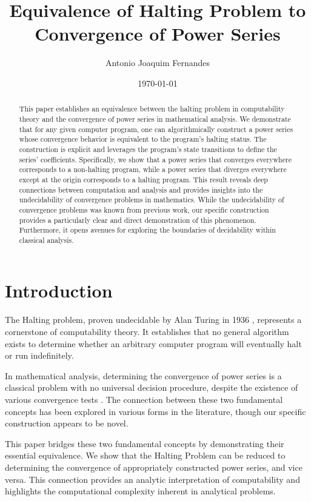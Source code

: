 \documentclass[12pt, a4paper]{article}
\title{Equivalence of Halting Problem to Convergence of Power Series}
\author[1]{Antonio Joaquim Fernandes}
\affil[1]{FCT, Universidade de Cabo Verde}
\date{\today}
\begin{document}
\maketitle

\begin{abstract}
This paper establishes an equivalence between the halting problem in computability theory and the convergence of power series in mathematical analysis. We demonstrate that for any given computer program, one can algorithmically construct a power series whose convergence behavior is equivalent to the program’s halting status. The construction is explicit and leverages the program's state transitions to define the series' coefficients. Specifically, we show that a power series that converges everywhere corresponds to a non-halting program, while a power series that diverges everywhere except at the origin corresponds to a halting program. This result reveals deep connections between computation and analysis and provides insights into the undecidability of convergence problems in mathematics. While the undecidability of convergence problems was known from previous work, our specific construction provides a particularly clear and direct demonstration of this phenomenon. Furthermore, it opens avenues for exploring the boundaries of decidability within classical analysis.
\end{abstract}

\section{Introduction}
The Halting problem, proven undecidable by Alan Turing in 1936 \cite{turing1936computable}, represents a cornerstone of computability theory. It establishes that no general algorithm exists to determine whether an arbitrary computer program will eventually halt or run indefinitely. 

In mathematical analysis, determining the convergence of power series is a classical problem with no universal decision procedure, despite the existence of various convergence tests \cite{rice1953classes,pourel1989computable, weihrauch2000computable}. The connection between these two fundamental concepts has been explored in various forms in the literature, though our specific construction appears to be novel.

This paper bridges these two fundamental concepts by demonstrating their essential equivalence. We show that the Halting Problem can be reduced to determining the convergence of appropriately constructed power series, and vice versa. This connection provides an analytic interpretation of computability and highlights the computational complexity inherent in analytical problems.
\end{document}
